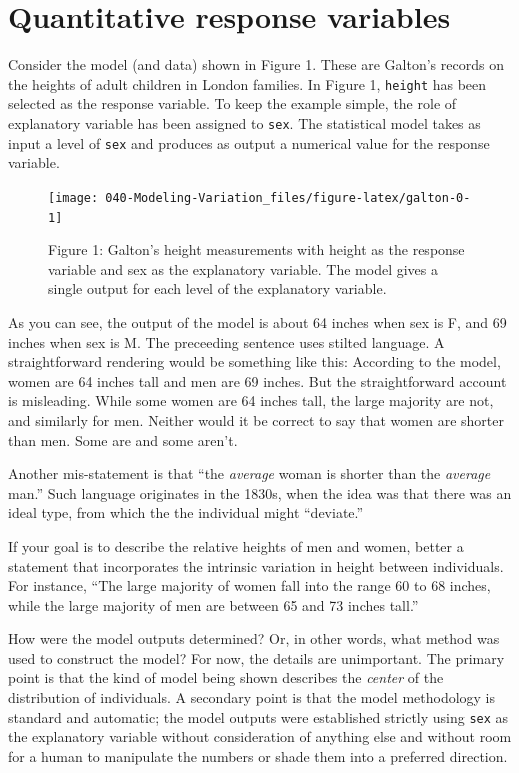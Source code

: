 \documentclass[]{book}
\begin{document}
\hypertarget{quantitative-response-variables}{%
\section{Quantitative response variables}\label{quantitative-response-variables}}

Consider the model (and data) shown in Figure 1. These are Galton's records on the heights of adult children in London families. In Figure 1, \texttt{height} has been selected as the response variable. To keep the example simple, the role of explanatory variable has been assigned to \texttt{sex}. The statistical model takes as input a level of \texttt{sex} and produces as output a numerical value for the response variable.

\begin{figure}\texttt{[image: 040-Modeling-Variation\_files/figure-latex/galton-0-1]} \caption{Figure 1: Galton's height measurements with height as the response variable and sex as the explanatory variable. The model gives a single output for each level  of  the explanatory variable.}\label{fig:galton-0}
\end{figure}

As you can see, the output of the model is about 64 inches when sex is F, and 69 inches when sex is M. The preceeding sentence uses stilted language. A straightforward rendering would be something like this: According to the model, women are 64 inches tall and men are 69 inches. But the straightforward account is misleading. While some women are 64 inches tall, the large majority are not, and similarly for men. Neither would it be correct to say that women are shorter than men. Some are and some aren't.

Another mis-statement is that ``the \emph{average} woman is shorter than the \emph{average} man.'' Such language originates in the 1830s, when the idea was that there was an ideal type, from which the the individual might ``deviate.''

If your goal is to describe the relative heights of men and women, better a statement that incorporates the intrinsic variation in height between individuals. For instance, ``The large majority of women fall into the range 60 to 68 inches, while the large majority of men are between 65 and 73 inches tall.''

How were the model outputs determined? Or, in other words, what method was used to construct the model? For now, the details are unimportant. The primary point is that the kind of model being shown describes the \emph{center} of the distribution of individuals. A secondary point is that the model methodology is standard and automatic; the model outputs were established strictly using \texttt{sex} as the explanatory variable without consideration of anything else and without room for a human to manipulate the numbers or shade them into a preferred direction.
\end{document}
